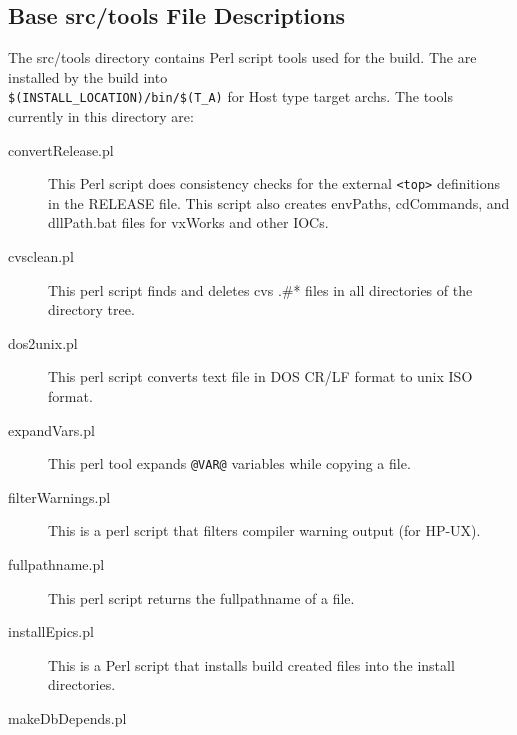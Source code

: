 \subsection{Base src/tools File Descriptions}

The src/tools directory contains Perl script tools used for the build. The are installed by the build into \\
\verb|$(INSTALL_LOCATION)/bin/$(T_A)| for Host type target archs. The tools currently in this directory are:

\begin{description}

\item[convertRelease.pl]

This Perl script does consistency checks for the external \verb|<top>| definitions in the RELEASE file. This script also creates envPaths, cdCommands, and dllPath.bat files for vxWorks and other IOCs.

\item[cvsclean.pl]

This perl script finds and deletes cvs .\#* files in all directories of the directory tree.

\item[dos2unix.pl]

This perl script converts text file in DOS CR/LF format to unix ISO format.

\item[expandVars.pl]

This perl tool expands \verb|@VAR@| variables while copying a file.

\item[filterWarnings.pl]

This is a perl script that filters compiler warning output (for HP-UX).

\item[fullpathname.pl]

This perl script returns the fullpathname of a file.

\item[installEpics.pl]

This is a Perl script that installs build created files into the install directories.

\item[makeDbDepends.pl]


\end{description}
